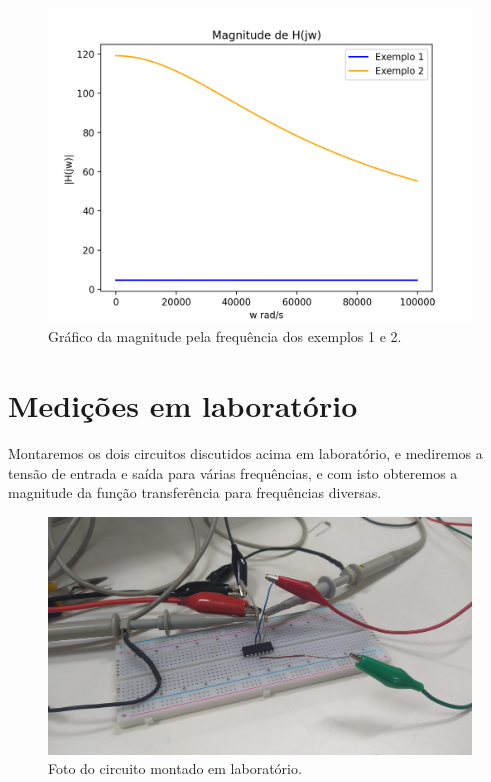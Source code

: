 \documentclass[12pt,twoside, a4paper, twocolumn]{article}
\begin{document}
\begin{figure}[h]
    \centering
    \includegraphics[width=1\columnwidth]{images/plot_bode.png}
    \caption{Gráfico da magnitude pela frequência dos exemplos 1 e 2.}
\end{figure}


\newpage


\section{Medições em laboratório}


Montaremos os dois circuitos discutidos acima em laboratório, e mediremos a tensão de entrada e saída para várias frequências, e com isto obteremos a magnitude da função transferência para frequências diversas.


\begin{figure}[h]
    \centering
    \includegraphics[width=1\columnwidth]{images/circuitoreal.jpeg}
    \caption{Foto do circuito montado em laboratório.}
\end{figure}
\end{document}
